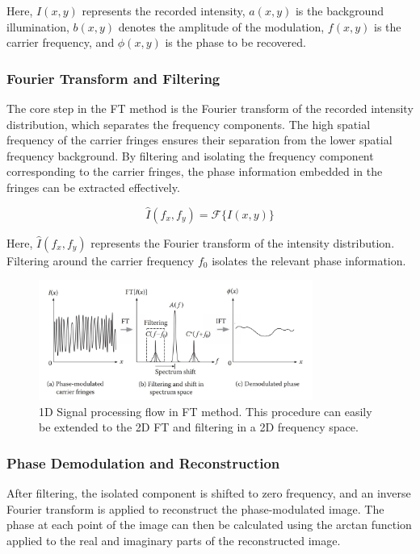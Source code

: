 \documentclass[../main.tex]{subfiles}
\begin{document}
Here, \( I(x, y) \) represents the recorded intensity, \( a(x, y) \) is the background illumination, \( b(x, y) \) denotes the amplitude of the modulation, \( f(x, y) \) is the carrier frequency, and \( \phi(x, y) \) is the phase to be recovered.

\subsubsection{Fourier Transform and Filtering}
The core step in the FT method is the Fourier transform of the recorded intensity distribution, which separates the frequency components. The high spatial frequency of the carrier fringes ensures their separation from the lower spatial frequency background. By filtering and isolating the frequency component corresponding to the carrier fringes, the phase information embedded in the fringes can be extracted effectively.

\begin{equation}
    \hat{I}(f_x, f_y) = \mathcal{F}\{I(x, y)\}
\end{equation}

Here, \( \hat{I}(f_x, f_y) \) represents the Fourier transform of the intensity distribution. Filtering around the carrier frequency \( f_0 \) isolates the relevant phase information.

\begin{frame}{}
    \begin{figure}[H]
        \centering
        \includegraphics[width=0.8\textwidth]{Images/Introduction/fourier_transform}
        \caption{1D Signal processing flow in FT method. This procedure can easily be extended to the 2D FT and filtering in a 2D frequency space.\cite{fringe_analysis}}
        \label{fig:fourier_transform}
    \end{figure}
\end{frame}

\subsubsection{Phase Demodulation and Reconstruction}
After filtering, the isolated component is shifted to zero frequency, and an inverse Fourier transform is applied to reconstruct the phase-modulated image. The phase at each point of the image can then be calculated using the arctan function applied to the real and imaginary parts of the reconstructed image.
\end{document}
